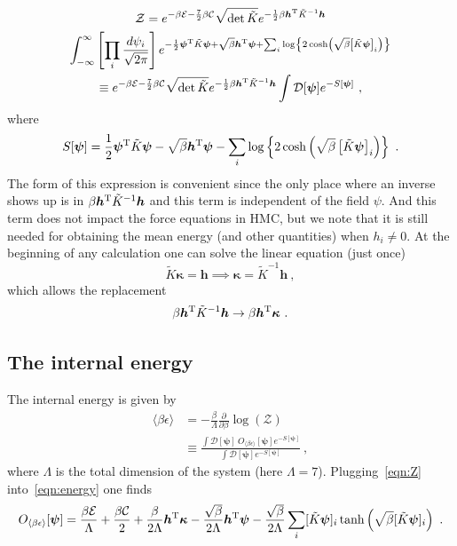 \documentclass[11pt]{article}
\begin{document}
\begin{multline}\label{eqn:Z}
\mathcal{Z}=e^{-\beta\mathcal{E}-\frac{7}{2}\beta\mathcal{C}}\sqrt{\operatorname{det}\tilde K}e^{-\frac{1}{2} \beta \bm h^{\rm T} \tilde{K}^{-1} \bm h}\\
\int_{-\infty}^{\infty}\left[\prod_{i} \frac{d \psi_{i}}{\sqrt{2 \pi}}\right]
e^{-\frac{1}{2}\bm\psi^{\rm T} \tilde K\bm \psi+\sqrt{\beta}\bm h^{\rm T}\bm\psi+\sum_i\log\left\{2\cosh\left(\sqrt{\beta}\left[\tilde{K}\bm \psi\right]_i\right)\right\}}\\
\equiv e^{-\beta\mathcal{E}-\frac{7}{2}\beta\mathcal{C}}\sqrt{\operatorname{det}\tilde K}e^{-\frac{1}{2} \beta \bm h^{\rm T} \tilde{K}^{-1} \bm h}
\int\mathcal{D}[\bm\psi]
e^{-S[\bm\psi]}\ ,
\end{multline}
where
\begin{equation}
S[\bm\psi]=\frac{1}{2}\bm\psi^{\rm T} \tilde K\bm \psi-\sqrt{\beta}\bm h^{\rm T}\bm\psi-\sum_i\log\left\{2\cosh\left(\sqrt{\beta}\left[\tilde{K}\bm \psi\right]_i\right)\right\}\ .
\end{equation}
The form of this expression is convenient since the only place where an inverse shows up is in $\beta \bm h^{\rm T} \tilde{K}^{-1} \bm h$ and this term is independent of the field $\psi$.  And this term does not impact the force equations in HMC, but we note that it is still needed for obtaining the mean energy (and other quantities) when $h_i\ne 0$.  At the beginning of any calculation one can solve the linear equation (just once)
\begin{displaymath}
\tilde K\bm\kappa =\bm h\implies \bm \kappa = \tilde K^{-1}\bm h\ ,
\end{displaymath}
which allows the replacement
\begin{displaymath}
\beta \bm h^{\rm T} \tilde{K}^{-1} \bm h\rightarrow\beta \bm h^{\rm T}\bm \kappa\ .
\end{displaymath}

\subsection{The internal energy}
The internal energy is given by
\begin{align}
\langle\beta \epsilon\rangle&=-\frac{\beta}{\Lambda} \frac{\partial}{\partial \beta} \log (\mathcal{Z})\label{eqn:energy}\\
&\equiv\frac{\int\mathcal{D}[\bm\psi]\ O_{\langle \beta\epsilon\rangle}[\bm\psi]e^{-S[\bm\psi]}}{\int\mathcal{D}[\bm\psi]e^{-S[\bm\psi]}}\ ,
\end{align}
where $\Lambda$ is the total dimension of the system  (here $\Lambda=7$).  Plugging~\eqref{eqn:Z} into~\eqref{eqn:energy} one finds
\begin{equation}\label{eqn:energy op}
O_{\langle \beta\epsilon\rangle}[\bm\psi]=\frac{\beta\mathcal{E}}{\Lambda}+\frac{\beta\mathcal{C}}{2}
+\frac{\beta}{2\Lambda}\bm h^{\rm T}\bm\kappa
-\frac{\sqrt{\beta}}{2\Lambda}\bm h^{\rm T}\bm\psi
-\frac{\sqrt{\beta}}{2 \Lambda} \sum_{i} [\tilde{K}\bm\psi]_i \tanh \left(\sqrt{\beta} [\tilde{K}\bm\psi]_i\right)\ .
\end{equation}
\end{document}
